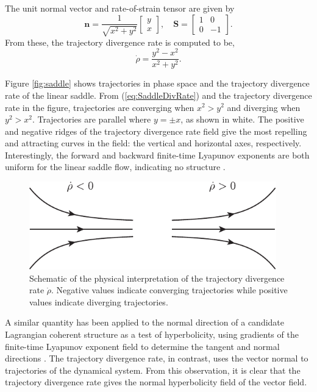 \documentclass[twocolumn]{svjour3}
\begin{document}
The unit normal vector and rate-of-strain tensor are given by 
\begin{equation}
\mathbf{n} = \frac{1}{\sqrt{x^2+y^2}}\left[\begin{array}{c}
y \\
x
\end{array}\right], \quad
\mathbf{S} = \left[\begin{array}{cc}
1 & 0 \\
0 & -1
\end{array}\right].
\end{equation}
From these, the trajectory divergence rate is computed to be,
\begin{equation}
\dot{\rho} = \frac{y^2-x^2}{x^2+y^2}.
\label{eq:SaddleDivRate}
\end{equation}

Figure \ref{fig:saddle} shows trajectories in phase space and the trajectory divergence rate of the linear saddle. From (\ref{eq:SaddleDivRate}) and the trajectory divergence rate in the figure, trajectories are converging when $x^2>y^2$ and diverging when $y^2>x^2$. Trajectories are parallel where $y=\pm x$, as shown in white. The positive and negative ridges of the trajectory divergence rate field give the most repelling and attracting curves in the field: the vertical and horizontal axes, respectively. Interestingly, the forward and backward finite-time Lyapunov exponents are both uniform for the linear saddle flow, indicating no structure \cite{haller_variational_2011}.

\begin{figure}
\centering
\includegraphics[height=1.5in]{Fig5}
\caption{Schematic of the physical interpretation of the trajectory divergence rate $\dot{\rho}$. Negative values indicate converging trajectories while positive values indicate diverging trajectories.}
\label{fig:DivRateSchema}
\end{figure}

A similar quantity has been applied to the normal direction of a candidate Lagrangian coherent structure as a test of hyperbolicity, using gradients of the finite-time Lyapunov exponent field to determine the tangent and normal directions \cite{green2010using}. The trajectory divergence rate, in contrast, uses the vector normal to trajectories of the dynamical system. From this observation, it is clear that the trajectory divergence rate gives the normal hyperbolicity field of the vector field.
\end{document}
